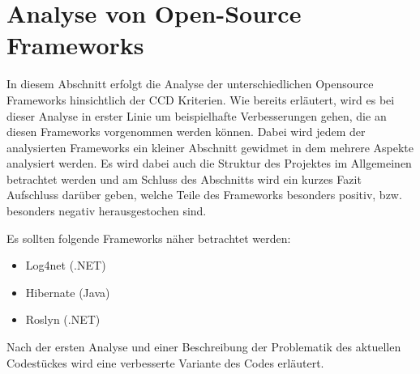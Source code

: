 \chapter{Analyse von Open-Source Frameworks}
\label{chap:Abbildungen}
In diesem Abschnitt erfolgt die Analyse der unterschiedlichen Opensource Frameworks hinsichtlich der CCD Kriterien. Wie bereits erläutert, wird es bei dieser Analyse in erster Linie um beispielhafte Verbesserungen gehen, die an diesen Frameworks vorgenommen werden können. Dabei wird jedem der analysierten Frameworks ein kleiner Abschnitt gewidmet in dem mehrere Aspekte analysiert werden. Es wird dabei auch die Struktur des Projektes im Allgemeinen betrachtet werden und am Schluss des Abschnitts wird ein kurzes Fazit Aufschluss darüber geben, welche Teile des Frameworks besonders positiv, bzw. besonders negativ herausgestochen sind. 

\SuperPar Es sollten folgende Frameworks näher betrachtet werden:

\begin{itemize}
	\item Log4net (.NET)
	\item Hibernate (Java)
	\item Roslyn (.NET)
\end{itemize}

Nach der ersten Analyse und einer Beschreibung der Problematik des aktuellen Codestückes wird eine verbesserte Variante des Codes erläutert. 
\newpage